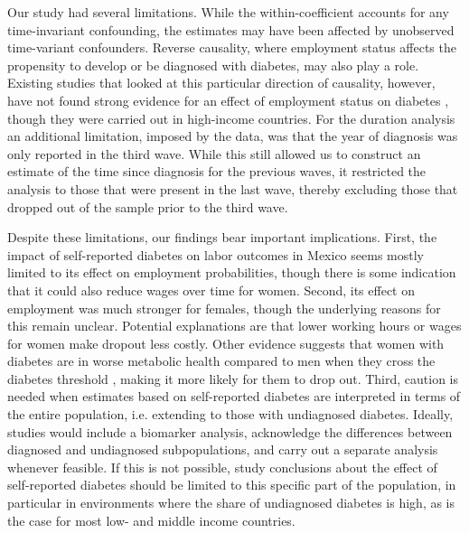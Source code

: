 \documentclass[12pt,english]{article}
\begin{document}
Our study had several limitations. While the within-coefficient accounts for any time-invariant confounding, the estimates may have been affected by unobserved time-variant confounders. Reverse causality, where employment status affects the propensity to develop or be diagnosed with diabetes, may also play a role. Existing studies that looked at this particular direction of causality, however, have not found strong evidence for an effect of employment status on diabetes \parencite{Bergemann2011,Schaller2015}, though they were carried out in high-income countries. For the duration analysis an additional limitation, imposed by the data, was that the year of diagnosis was only reported in the third wave. While this still allowed us to construct an estimate of the time since diagnosis for the previous waves, it restricted the analysis to those that were present in the last wave, thereby excluding those that dropped out of the sample prior to the third wave. 

Despite these limitations, our findings bear important implications. First, the impact of self-reported diabetes on labor outcomes in Mexico seems mostly limited to its effect on employment probabilities, though there is some indication that it could also reduce wages over time for women.  Second, its effect on employment was much stronger for females, though the underlying reasons for this remain unclear. Potential explanations are that lower working hours or wages for women make dropout less costly. Other evidence suggests that women with diabetes are in worse metabolic health compared to men when they cross the diabetes threshold \parencite{Peters2015}, making it more likely for them to drop out. Third, caution is needed when estimates based on self-reported diabetes are interpreted in terms of the entire population, i.e. extending to those with undiagnosed diabetes. Ideally, studies would  include a biomarker analysis, acknowledge the differences between diagnosed and undiagnosed subpopulations, and carry out a separate analysis whenever feasible. If this is not possible, study conclusions about the effect of self-reported diabetes should be limited to this specific part of the population, in particular in environments where the share of undiagnosed diabetes is high, as is the case for most low- and middle income countries.
\end{document}
